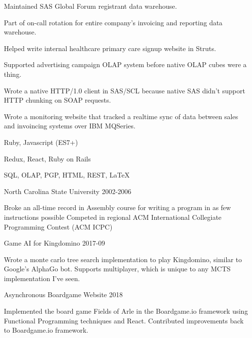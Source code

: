 \documentclass[11pt,english]{article}
\begin{document}
\begin{description}
Maintained SAS Global Forum registrant data warehouse.

Part of on-call rotation for entire company's invoicing and reporting data warehouse.

Helped write internal healthcare primary care signup website in Struts.

Supported advertising campaign OLAP system before native OLAP cubes were a thing.

Wrote a native HTTP/1.0 client in SAS/SCL because native SAS didn't support HTTP chunking on SOAP requests.

Wrote a monitoring website that tracked a realtime sync of data between sales and invoincing systems over
IBM MQSeries.

\end{description}


      {Ruby, Javascript (ES7+)}

      {Redux, React, Ruby on Rails}

      {SQL, OLAP, PGP, HTML, REST, \LaTeX}


\begin{description}
\squish
{} {North Carolina State University}
           {2002-2006}
 
Broke an all-time record in Assembly course for writing a program in as few instructions possible
Competed in regional ACM International Collegiate Programming Contest (ACM ICPC)

\end{description}


\begin{description}
\squish

           {Game AI for Kingdomino}
           {2017-09}

Wrote a monte carlo tree search implementation to play Kingdomino, similar to
Google's AlphaGo bot. Supports multiplayer, which is unique to any MCTS
implementation I've seen.

           {Asynchronous Boardgame Website}
           {2018}

Implemented the board game Fields of Arle in the Boardgame.io framework using Functional Programming techniques and React. Contributed improvements back to Boardgame.io framework.


\end{description}
\end{document}
